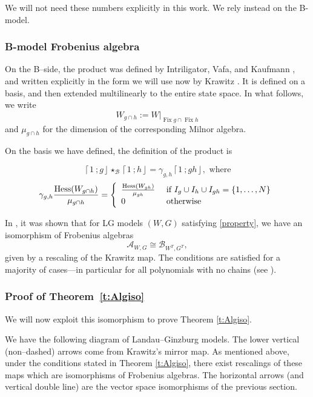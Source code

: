 \documentclass[10pt, letterpaper]{amsart}
\theoremstyle{remark}
\newcommand{\sA}{\mathscr{A}}
\newcommand{\sB}{\mathscr{B}}
\newcommand{\fjrw}[2]{ \left\lceil #1 \:; #2 \right\rfloor }
\DeclareMathOperator{\Hess}{Hess}
\DeclareMathOperator{\Fix}{Fix}
\begin{document}
We will not need these numbers explicitly in this work. We rely instead on the B-model. 


\subsubsection{B-model Frobenius algebra}
On the B--side, the product was defined by Intriligator, Vafa, and Kaufmann \cite{IV, kau1,kau2,kau3}, and written explicitly in the form we will use now by Krawitz \cite{Kr}. It is defined on a basis, and then extended multilinearly to the entire state space. In what follows, we write 
\[
W_{g\cap h}:= W|_{\Fix g \cap \Fix h}
\]
and $\mu_{g\cap h}$ for the dimension of the corresponding Milnor algebra. 

On the basis we have defined, the definition of the product is 

\[
\fjrw{1}{g}\star_{\sB} \fjrw{1}{h} = \gamma_{g,h} \fjrw{1}{gh}, \text{ where}
\]
\[
\gamma_{g,h} \frac{\Hess (W_{g\cap h})}{\mu_{g\cap h}} = \left\{ \begin{array}{l l }
\frac{\Hess (W_{gh})}{\mu_{gh}} & \text{ if } I_g \cup I_h \cup I_{gh} = \{1, \ldots, N\}\\
0 & \text{ otherwise} \\ \end{array}\right.
\]

In \cite{FJJS}, it was shown that for LG models $(W,G)$ satisfying \autoref{property}, we have an isomorphism of Frobenius algebras
\[
\sA_{W,G}\cong \sB_{W^T,G^T}, 
\]
given by a rescaling of the Krawitz map. 
The conditions are satisfied for a majority of cases---in particular for all polynomials with no chains (see \cite[Remark 1.1.1]{FJJS}). 


\subsubsection{Proof of Theorem~\ref{t:Algiso}}We will now exploit this isomorphism to prove Theorem \ref{t:Algiso}. 

We have the following diagram of Landau--Ginzburg models. The lower vertical (non--dashed) arrows come from Krawitz's mirror map. As mentioned above, under the conditions stated in Theorem \ref{t:Algiso}, there exist rescalings of these maps which are isomorphisms of Frobenius algebras. The horizontal arrows (and vertical double line) are the vector space isomorphisms of the previous section.   
\end{document}
